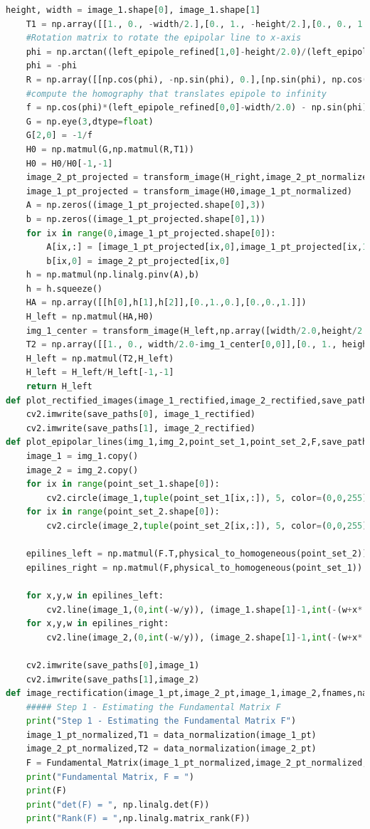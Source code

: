 \documentclass{article}
\begin{document}
\begin{lstlisting}[language=Python]
	height, width = image_1.shape[0], image_1.shape[1]
	T1 = np.array([[1., 0., -width/2.],[0., 1., -height/2.],[0., 0., 1.]])
	#Rotation matrix to rotate the epipolar line to x-axis
	phi = np.arctan((left_epipole_refined[1,0]-height/2.0)/(left_epipole_refined[0,0]-width/2.0))
	phi = -phi
	R = np.array([[np.cos(phi), -np.sin(phi), 0.],[np.sin(phi), np.cos(phi), 0.],[0.,0.,1.]])
	#compute the homography that translates epipole to infinity
	f = np.cos(phi)*(left_epipole_refined[0,0]-width/2.0) - np.sin(phi)*(left_epipole_refined[1,0]-height/2.0)
	G = np.eye(3,dtype=float)
	G[2,0] = -1/f
	H0 = np.matmul(G,np.matmul(R,T1))
	H0 = H0/H0[-1,-1]
	image_2_pt_projected = transform_image(H_right,image_2_pt_normalized)
	image_1_pt_projected = transform_image(H0,image_1_pt_normalized)
	A = np.zeros((image_1_pt_projected.shape[0],3))
	b = np.zeros((image_1_pt_projected.shape[0],1))
	for ix in range(0,image_1_pt_projected.shape[0]):
		A[ix,:] = [image_1_pt_projected[ix,0],image_1_pt_projected[ix,1],1.]
		b[ix,0] = image_2_pt_projected[ix,0]
	h = np.matmul(np.linalg.pinv(A),b)
	h = h.squeeze()
	HA = np.array([[h[0],h[1],h[2]],[0.,1.,0.],[0.,0.,1.]])
	H_left = np.matmul(HA,H0)
	img_1_center = transform_image(H_left,np.array([width/2.0,height/2.0]).reshape([1,2]))
	T2 = np.array([[1., 0., width/2.0-img_1_center[0,0]],[0., 1., height/2.0-img_1_center[0,1]],[0., 0., 1.]])
	H_left = np.matmul(T2,H_left)
	H_left = H_left/H_left[-1,-1]
	return H_left
def plot_rectified_images(image_1_rectified,image_2_rectified,save_paths):
	cv2.imwrite(save_paths[0], image_1_rectified)
	cv2.imwrite(save_paths[1], image_2_rectified)
def plot_epipolar_lines(img_1,img_2,point_set_1,point_set_2,F,save_paths):
	image_1 = img_1.copy()
	image_2 = img_2.copy()
	for ix in range(point_set_1.shape[0]):
		cv2.circle(image_1,tuple(point_set_1[ix,:]), 5, color=(0,0,255),thickness=5)
	for ix in range(point_set_2.shape[0]):
		cv2.circle(image_2,tuple(point_set_2[ix,:]), 5, color=(0,0,255),thickness=5)

	epilines_left = np.matmul(F.T,physical_to_homogeneous(point_set_2)).T
	epilines_right = np.matmul(F,physical_to_homogeneous(point_set_1)).T

	for x,y,w in epilines_left:
		cv2.line(image_1,(0,int(-w/y)), (image_1.shape[1]-1,int(-(w+x*(image_1.shape[1]-1))/y)), color=(0,0,0), thickness=3)
	for x,y,w in epilines_right:
		cv2.line(image_2,(0,int(-w/y)), (image_2.shape[1]-1,int(-(w+x*(image_2.shape[1]-1))/y)), color=(0,0,0), thickness=3)

	cv2.imwrite(save_paths[0],image_1)
	cv2.imwrite(save_paths[1],image_2)
def image_rectification(image_1_pt,image_2_pt,image_1,image_2,fnames,names,canvas_size):
	##### Step 1 - Estimating the Fundamental Matrix F
	print("Step 1 - Estimating the Fundamental Matrix F")
	image_1_pt_normalized,T1 = data_normalization(image_1_pt)
	image_2_pt_normalized,T2 = data_normalization(image_2_pt)
	F = Fundamental_Matrix(image_1_pt_normalized,image_2_pt_normalized,T1,T2)
	print("Fundamental Matrix, F = ")
	print(F)
	print("det(F) = ", np.linalg.det(F))
	print("Rank(F) = ",np.linalg.matrix_rank(F))


\end{lstlisting}
\end{document}
